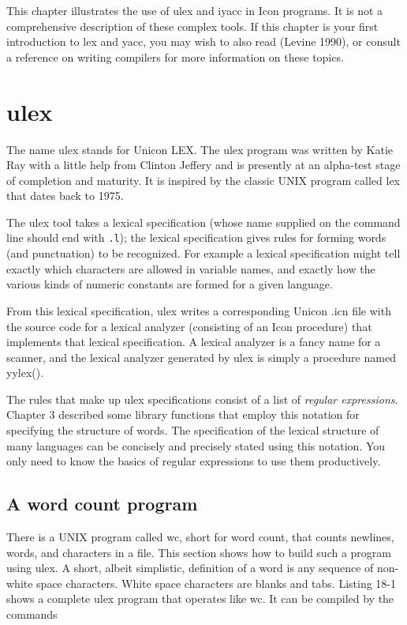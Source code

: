 This chapter illustrates the use of \textsf{ulex} and
\textsf{iyacc} in Icon programs. It is not a comprehensive description
of these complex tools. If this chapter is your first introduction to
\textsf{lex} and \textsf{yacc}, you may wish to also read (Levine
1990), or consult a reference on writing compilers for more information
on these topics.

\section{\textsf{ulex}}

The name \textsf{ulex} stands for Unicon LEX. The \textsf{ulex}
program was written by Katie Ray with a little help from Clinton Jeffery
and is presently at an alpha-test stage of completion and maturity.
It is inspired by the classic UNIX program called \textsf{lex} that
dates back to 1975.

The \textsf{ulex} tool takes a lexical specification (whose
name supplied on the command line should end with \texttt{.l}); the lexical
specification gives rules for forming words (and punctuation) to
be recognized.  For example a lexical specification might tell exactly
which characters are allowed in variable names, and exactly how the
various kinds of numeric constants are formed for a given language.

From this lexical specification, \textsf{ulex} writes a corresponding Unicon
.icn file with the source code for a lexical analyzer (consisting of an Icon
procedure) that implements that lexical specification. A lexical analyzer is a fancy name for a scanner, and the lexical
analyzer generated by \textsf{ulex} is simply a procedure named
\textsf{yylex()}.

The rules that make up
\textsf{ulex} specifications consist of a list of {\em regular expressions\/}.
Chapter 3 described some library functions that employ  this notation for specifying the structure
of words. The specification of the lexical structure of many languages
can be concisely and precisely stated using this notation. You only
need to know the basics of regular expressions to use them productively.

\subsection{A word count program}

There is a UNIX program called \textsf{wc}, short for word count, that counts newlines, words, and characters in a
file. This section shows how to build such a program using
\textsf{ulex}. A short, albeit simplistic, definition of a word is any
sequence of non-white space characters. White space characters are
blanks and tabs. Listing 18-1 shows a complete \textsf{ulex} program that
operates like \textsf{wc}.  It can be compiled by the commands


